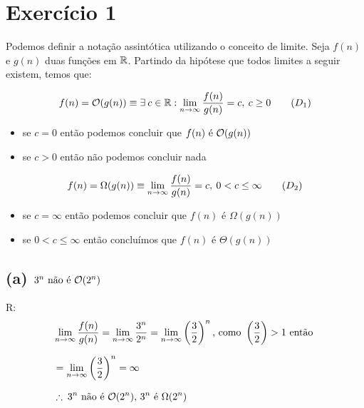 \section*{Exercício 1}
  Podemos definir a notação assintótica utilizando o conceito de limite. Seja $f(n)$ e $g(n)$ duas funções em $\mathbb{R}$. Partindo da hipótese que todos limites a seguir existem, temos que:

  \begin{equation*}
    \setlength{\jot}{10pt}
    \begin{aligned}
      f(n) = \bigO(g(n)) \equiv \exists\:c \in \setR: \lim_{n \to\infty} \frac{f(n)}{g(n)} = c,\: c \geq0
    \end{aligned}\tag{$D_1$}
  \end{equation*}
  \begin{itemize}
    \item{se $c = 0$ então podemos concluir que $f(n) \text{ é } \mathcal{O}(g(n))$}
    \item{se $c > 0$ então não podemos concluir nada}
  \end{itemize}

  \begin{equation*}
    \setlength{\jot}{10pt}
    \begin{aligned}
      f(n) = \Omega(g(n)) \equiv \lim_{n \to\infty} \frac{f(n)}{g(n)} = c,\: 0 < c \leq \infty
    \end{aligned}\tag{$D_2$}
  \end{equation*}
  \begin{itemize}
    \item{se $c = \infty$ então podemos concluir que $f(n) \text{ é } \Omega(g(n))$}
    \item{se $0 < c \leq \infty$ então concluímos que  $f(n) \text{ é } \Theta(g(n))$}
  \end{itemize}
  \newpage
  \subsection*{(a) $3^n \text{ não é } \mathcal{O}(2^n)$}
  R:
  \begin{equation*}
    \setlength{\jot}{10pt}
    \begin{aligned}
    &\lim_{n \to\infty} \frac{f(n)}{g(n)} = \lim_{n \to\infty} \frac{3^n}{2^n} = \lim_{n \to\infty} \left(\frac{3}{2}\right)^n \text{, como } \left(\frac{3}{2}\right) > 1 \text{ então } \\
    &= \lim_{n \to\infty} \left(\frac{3}{2}\right)^n = \infty \\
    &\therefore\: 3^n \text{ não é } \bigO(2^n) \text{, } 3^n \text{ é } \Omega(2^n)
  \end{aligned}\end{equation*}

